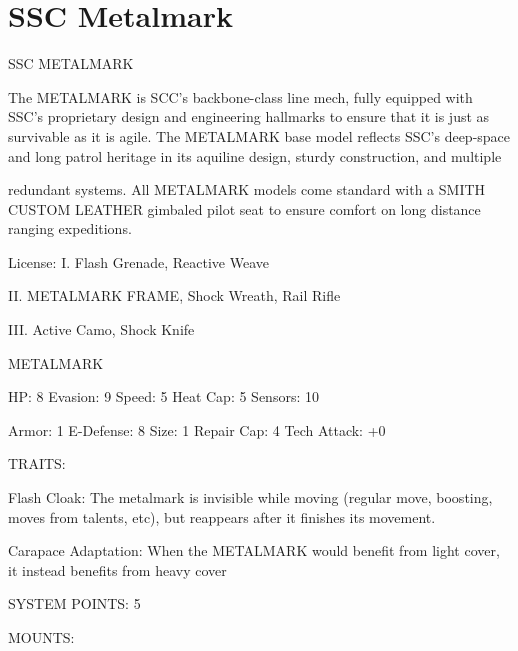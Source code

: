 
\section{SSC Metalmark}
                                                                                                                          
                                             SSC METALMARK  

The METALMARK is SCC’s backbone-class line mech, fully equipped with SSC’s proprietary design and  
engineering hallmarks to ensure that it is just as survivable as it is agile. The METALMARK base model  
reflects SSC’s deep-space and long patrol heritage in its aquiline design, sturdy construction, and multiple  

redundant systems. All METALMARK models come standard with a SMITH CUSTOM LEATHER gimbaled  
pilot seat to ensure comfort on long distance ranging expeditions.   

                                                                                                                     


                                                     License:  
 I. Flash Grenade, Reactive Weave
 
 II. METALMARK FRAME, Shock Wreath, Rail Rifle
 
 III. Active Camo, Shock Knife
 

                                                METALMARK 

  HP: 8          Evasion: 9                             Speed: 5            Heat Cap: 5         Sensors: 10 

 Armor: 1        E-Defense: 8                           Size: 1             Repair Cap: 4       Tech Attack:  
                                                                                                +0 

                                                     TRAITS: 

  Flash Cloak: The metalmark is invisible while moving (regular move, boosting, moves from talents, etc),  
  but reappears after it finishes its movement.
 
  Carapace Adaptation: When the METALMARK would benefit from light cover, it instead benefits from  
  heavy cover 

                                              SYSTEM POINTS: 5 

                                                    MOUNTS: 


